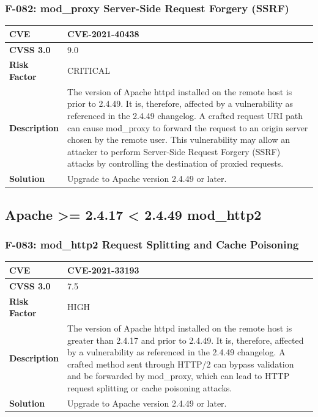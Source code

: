 \subsubsection{F-082: mod\_proxy Server-Side Request Forgery (SSRF)}
\begin{tabular}{|p{2.8cm}|p{12.2cm}|}
\hline
\textbf{CVE} & CVE-2021-40438 \\ \hline
\textbf{CVSS 3.0} & 9.0 \\ \hline
\textbf{Risk Factor} & CRITICAL \\ \hline
\textbf{Description} & The version of Apache httpd installed on the remote host is prior to 2.4.49. It is, therefore, affected by a vulnerability as referenced in the 2.4.49 changelog. A crafted request URI path can cause mod\_proxy to forward the request to an origin server chosen by the remote user. This vulnerability may allow an attacker to perform Server-Side Request Forgery (SSRF) attacks by controlling the destination of proxied requests. \\ \hline
\textbf{Solution} & Upgrade to Apache version 2.4.49 or later. \\ \hline
\end{tabular}

%
%
\subsection{Apache >= 2.4.17 < 2.4.49 mod\_http2}

\subsubsection{F-083: mod\_http2 Request Splitting and Cache Poisoning}
\begin{tabular}{|p{2.8cm}|p{12.2cm}|}
\hline
\textbf{CVE} & CVE-2021-33193 \\ \hline
\textbf{CVSS 3.0} & 7.5 \\ \hline
\textbf{Risk Factor} & HIGH \\ \hline
\textbf{Description} & The version of Apache httpd installed on the remote host is greater than 2.4.17 and prior to 2.4.49. It is, therefore, affected by a vulnerability as referenced in the 2.4.49 changelog. A crafted method sent through HTTP/2 can bypass validation and be forwarded by mod\_proxy, which can lead to HTTP request splitting or cache poisoning attacks. \\ \hline
\textbf{Solution} & Upgrade to Apache version 2.4.49 or later. \\ \hline
\end{tabular}

